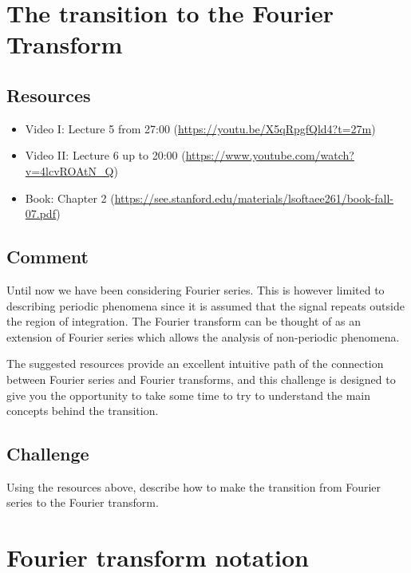 \newpage
\section{The transition to the Fourier Transform}

\subsection*{Resources}
\begin{itemize}
    \item Video I: Lecture 5 from 27:00 (\url{https://youtu.be/X5qRpgfQld4?t=27m})
    \item Video II: Lecture 6 up to 20:00 (\url{https://www.youtube.com/watch?v=4lcvROAtN_Q})
    \item Book: Chapter 2 (\url{https://see.stanford.edu/materials/lsoftaee261/book-fall-07.pdf})
\end{itemize}

\subsection*{Comment}
Until now we have been considering Fourier series. This is however limited to describing periodic phenomena since it is assumed that the signal repeats outside the region of integration. The Fourier transform can be thought of as an extension of Fourier series which allows the analysis of non-periodic phenomena.

The suggested resources provide an excellent intuitive path of the connection between Fourier series and Fourier transforms, and this challenge is designed to give you the opportunity to take some time to try to understand the main concepts behind the transition.

\subsection*{Challenge}
Using the resources above, describe how to make the transition from Fourier series to the Fourier transform.



\iffalse
\newpage
\section{Fourier transform notation}

